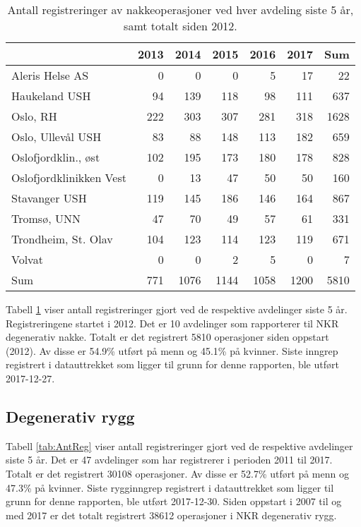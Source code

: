 \documentclass [norsk,a4paper,twoside]{article}\usepackage[]{graphicx}\usepackage[]{color}
\begin{document}
\begin{table}[ht]
\centering
\begin{tabular}{lrrrrrr}
  \hline
 & 2013 & 2014 & 2015 & 2016 & 2017 & Sum \\ 
  \hline
Aleris Helse AS & 0 & 0 & 0 & 5 & 17 & 22 \\ 
  Haukeland USH & 94 & 139 & 118 & 98 & 111 & 637 \\ 
  Oslo, RH & 222 & 303 & 307 & 281 & 318 & 1628 \\ 
  Oslo, Ullevål USH & 83 & 88 & 148 & 113 & 182 & 659 \\ 
  Oslofjordklin., øst & 102 & 195 & 173 & 180 & 178 & 828 \\ 
  Oslofjordklinikken Vest & 0 & 13 & 47 & 50 & 50 & 160 \\ 
  Stavanger USH & 119 & 145 & 186 & 146 & 164 & 867 \\ 
  Tromsø, UNN & 47 & 70 & 49 & 57 & 61 & 331 \\ 
  Trondheim, St. Olav & 104 & 123 & 114 & 123 & 119 & 671 \\ 
  Volvat & 0 & 0 & 2 & 5 & 0 & 7 \\ 
  Sum & 771 & 1076 & 1144 & 1058 & 1200 & 5810 \\ 
   \hline
\end{tabular}
\caption{Antall registreringer av nakkeoperasjoner ved hver avdeling siste 5 år, samt totalt siden 2012.} 
\label{tab:AntRegNakke}
\end{table}



Tabell \ref{tab:AntRegNakke} viser antall 
registreringer gjort ved de respektive avdelinger siste 5 år. Registreringene startet i 2012. 
Det er  
10 avdelinger som rapporterer til NKR degenerativ nakke. Totalt er det registrert 5810 operasjoner siden oppstart (2012). Av disse er 54.9\% utført på menn og 45.1\% på kvinner.
Siste inngrep registrert i datauttrekket som ligger til grunn for denne rapporten, ble utført 
2017-12-27. 
\par




\subsection{Degenerativ rygg}

Tabell \ref{tab:AntReg} viser antall 
registreringer gjort ved de respektive avdelinger siste 5 år. Det er  
47 avdelinger som har registrerer i perioden 2011 til 2017. Totalt er det registrert 30108 
operasjoner. Av disse er 52.7\% utført på menn og 47.3\% på kvinner.
Siste rygginngrep registrert i datauttrekket som ligger til grunn for denne rapporten, ble utført 
2017-12-30. Siden oppstart i 2007 til og med 2017 er det totalt registrert 38612 operasjoner i NKR degenerativ rygg. 
\par
\end{document}
